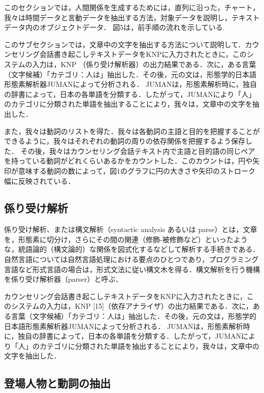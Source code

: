 \documentclass[shuuron]{kuee}
\begin{document}
このセクションでは，人間関係を生成するためには，直列に沿った，チャート，我々は時間データと言動データを抽出する方法，対象データを説明し，テキストデータ内のオブジェクトデータ． 図5は，前手順の流れを示している.

このサブセクションでは，文章中の文字を抽出する方法について説明して．カウンセリング会話書き起こしテキストデータをKNPに入力されたときに，このシステムの入力は，KNP \cite{KNP}（係り受け解析器）の出力結果である．次に，ある言葉（文字候補）「カテゴリ：人は」抽出した．その後，元の文は，形態学的日本語形態素解析器JUMAN\cite{juman}によって分析される． JUMANは，形態素解析時に，独自の辞書によって，日本の各単語を分類する．したがって，JUMANにより「人」のカテゴリに分類された単語を抽出することにより，我々は，文章中の文字を抽出した．

また，我々は動詞のリストを得た．我々は各動詞の主語と目的を把握することができるように，我々はそれぞれの動詞の周りの依存関係を把握するよう保存した．
その後，我々はカウンセリング会話テキスト内で主語と目的語の同じペアを持っている動詞がどれくらいあるかをカウントした．このカウントは，円や矢印が意味する動詞の数によって，図1のグラフに円の大きさや矢印のストローク幅に反映されている．


\subsection{係り受け解析}


係り受け解析、または構文解析（syntactic analysis あるいは parse）とは，文章を，形態素に切分け，さらにその間の関連（修飾-被修飾など）といったような，統語論的（構文論的）な関係を図式化するなどして解析する手続きである．自然言語については自然言語処理における要点のひとつであり，プログラミング言語など形式言語の場合は，形式文法に従い構文木を得る．構文解析を行う機構を係り受け解析器（parser）と呼ぶ．

カウンセリング会話書き起こしテキストデータをKNPに入力されたときに，このシステムの入力は，KNP [15]（依存アナライザ）の出力結果である．次に，ある言葉（文字候補）「カテゴリ：人は」抽出した．その後，元の文は，形態学的日本語形態素解析器JUMAN\cite{juman}によって分析される． JUMANは，形態素解析時に，独自の辞書によって，日本の各単語を分類する．したがって，JUMANにより「人」のカテゴリに分類された単語を抽出することにより，我々は，文章中の文字を抽出した．


\subsection{登場人物と動詞の抽出}
\end{document}
